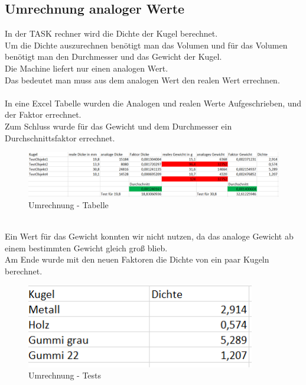 \documentclass[12pt,a4paper]{article}
\begin{document}
\subsection{Umrechnung analoger Werte}\label{Umrechnung analoger Werte}
In der TASK rechner wird die Dichte der Kugel berechnet.\\
Um die Dichte auszurechnen benötigt man das Volumen und für das Volumen benötigt man den Durchmesser und das Gewicht der Kugel.\\
Die Machine liefert nur einen analogen Wert.\\
Das bedeutet man muss aus dem analogen Wert den realen Wert errechnen.\\
\\
In eine Excel Tabelle wurden die Analogen und realen Werte Aufgeschrieben, und der Faktor errechnet.\\
Zum Schluss wurde für das Gewicht und dem Durchmesser ein Durchschnittsfaktor errechnet.\\
\begin{figure}[h]
\begin{center}
\includegraphics[width=15cm]{grafiken/UmrechnungsTabelle.png}
\caption{Umrechnung - Tabelle}
\label{Umrechnung}
\end{center}
\end{figure}
\\
Ein Wert für das Gewicht konnten wir nicht nutzen, da das analoge Gewicht ab einem bestimmten Gewicht gleich groß blieb.\\
Am Ende wurde mit den neuen Faktoren die Dichte von ein paar Kugeln berechnet.\\
\begin{figure}[h]
\begin{center}
\includegraphics[width=10cm]{grafiken/UmrechnungTests.png}
\caption{Umrechnung - Tests}
\label{Umrechnung}
\end{center}
\end{figure}
\newpage
\end{document}
